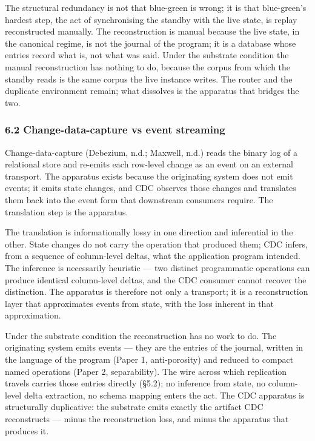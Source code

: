 \documentclass[
]{article}
\begin{document}
The structural redundancy is not that blue-green is wrong; it is that
blue-green's hardest step, the act of synchronising the standby with the
live state, is replay reconstructed manually. The reconstruction is
manual because the live state, in the canonical regime, is not the
journal of the program; it is a database whose entries record what is,
not what was said. Under the substrate condition the manual
reconstruction has nothing to do, because the corpus from which the
standby reads is the same corpus the live instance writes. The router
and the duplicate environment remain; what dissolves is the apparatus
that bridges the two.

\subsubsection{6.2 Change-data-capture vs event
streaming}\label{change-data-capture-vs-event-streaming}

Change-data-capture (Debezium, n.d.; Maxwell, n.d.) reads the binary log
of a relational store and re-emits each row-level change as an event on
an external transport. The apparatus exists because the originating
system does not emit events; it emits state changes, and CDC observes
those changes and translates them back into the event form that
downstream consumers require. The translation step is the apparatus.

The translation is informationally lossy in one direction and
inferential in the other. State changes do not carry the operation that
produced them; CDC infers, from a sequence of column-level deltas, what
the application program intended. The inference is necessarily heuristic
--- two distinct programmatic operations can produce identical
column-level deltas, and the CDC consumer cannot recover the
distinction. The apparatus is therefore not only a transport; it is a
reconstruction layer that approximates events from state, with the loss
inherent in that approximation.

Under the substrate condition the reconstruction has no work to do. The
originating system emits events --- they are the entries of the journal,
written in the language of the program (Paper 1, anti-porosity) and
reduced to compact named operations (Paper 2, separability). The wire
across which replication travels carries those entries directly (§5.2);
no inference from state, no column-level delta extraction, no schema
mapping enters the act. The CDC apparatus is structurally duplicative:
the substrate emits exactly the artifact CDC reconstructs --- minus the
reconstruction loss, and minus the apparatus that produces it.
\end{document}
